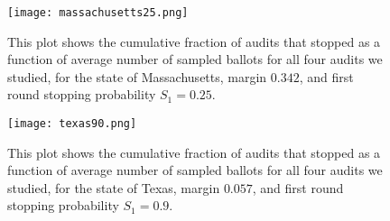 \begin{figure}
\begin{centering}
\texttt{[image: massachusetts25.png]}
\caption{This plot shows the cumulative fraction of audits that stopped as a function of average number of sampled ballots for all four audits we studied, for the state of Massachusetts, margin $0.342$, and first round stopping probability $S_1=0.25$.}
\label{fig:mass_25}
\end{centering}
\end{figure}

\begin{figure}
\begin{centering}
\texttt{[image: texas90.png]}
\caption{This plot shows the cumulative fraction of audits that stopped as a function of average number of sampled ballots for all four audits we studied, for the state of Texas, margin $0.057$, and first round stopping probability $S_1=0.9$.}
\label{fig:texas_90}
\end{centering}
\end{figure}

